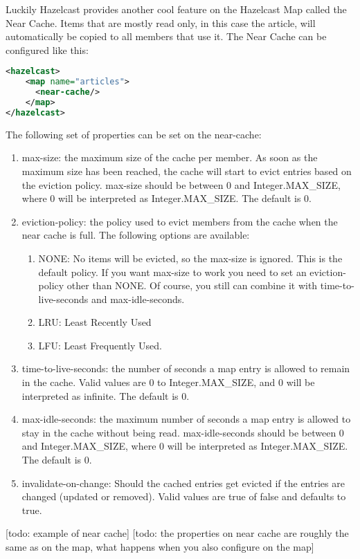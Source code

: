 Luckily Hazelcast provides another cool feature on the Hazelcast Map called the Near Cache. Items that are mostly read only, in this case the article, will automatically be copied to all members that use it. The Near Cache can be configured like this:
\begin{lstlisting}[language=xml]
<hazelcast>
    <map name="articles">
      <near-cache/>
    </map>
</hazelcast>
\end{lstlisting}
The following set of properties can be set on the near-cache:
\begin{enumerate}
\item max-size: the maximum size of the cache per member. As soon as the maximum size has been reached, the cache will start to evict entries based on the eviction policy. max-size should be between 0 and Integer.MAX\_SIZE, where 0 will be interpreted as Integer.MAX\_SIZE. The default is 0.
\item eviction-policy: the policy used to evict members from the cache when the near cache is full. The following options are available:
\begin{enumerate}
 \item NONE: No items will be evicted, so the max-size is ignored. This is the default policy. If you want max-size to work you need to set an eviction-policy other than NONE. Of course, you still can combine it with time-to-live-seconds and  max-idle-seconds.
 \item LRU: Least Recently Used
 \item LFU: Least Frequently Used.
\end{enumerate}
\item time-to-live-seconds: the number of seconds a map entry is allowed to remain in the cache. Valid values are 0 to Integer.MAX\_SIZE, and 0 will be interpreted as infinite. The default is 0.
\item max-idle-seconds: the maximum number of seconds a map entry is allowed to stay in the cache without being read. max-idle-seconds should be between 0 and Integer.MAX\_SIZE, where 0 will be interpreted as Integer.MAX\_SIZE. The default is 0. 
\item invalidate-on-change: Should the cached entries get evicted if the entries are changed (updated or removed). Valid values are true of false and defaults to true.
\end{enumerate}

[todo: example of near cache]
[todo: the properties on near cache are roughly the same as on the map, what happens when you also configure on the map]

